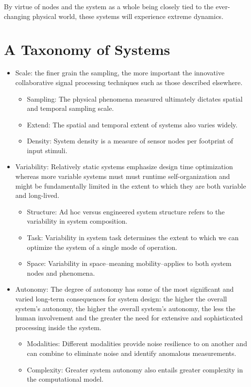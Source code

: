 \documentclass[letterpaper,10pt]{article}
\begin{document}
By virtue of nodes and the system as a whole being closely tied to the ever-changing physical world, these systems will experience extreme dynamics.

\section{A Taxonomy of Systems}

\begin{itemize}
	\item Scale: the finer grain the sampling, the more important the innovative collaborative signal processing techniques such as those described elsewhere.
	\begin{itemize}
		\item Sampling: The physical phenomena measured ultimately dictates spatial and temporal sampling scale.
		\item Extend: The spatial and temporal extent of systems also varies widely.
		\item Density: System density is a measure of sensor nodes per footprint of input stimuli.
	\end{itemize}
	\item Variability: Relatively static systems emphasize design time optimization whereas more variable systems must must runtime self-organization and might be fundamentally limited in the extent to which they are both variable and long-lived.
	\begin{itemize}
		\item Structure: Ad hoc versus engineered system structure refers to the variability in system composition.
		\item Task: Variability in system task determines the extent to which we can optimize the system of a single mode of operation.
		\item Space: Variability in space--meaning mobility--applies to both system nodes and phenomena.
	\end{itemize}
	\item Autonomy: The degree of autonomy has some of the most significant and varied long-term consequences for system design: the higher the overall system's autonomy, the higher the overall system's autonomy, the less the human involvement and the greater the need for extensive and sophisticated processing inside the system.
	\begin{itemize}
		\item Modalities: Different modalities provide noise resilience to on another and can combine to eliminate noise and identify anomalous measurements.
		\item Complexity: Greater system autonomy also entails greater complexity in the computational model.
	\end{itemize}
\end{itemize}
\end{document}
